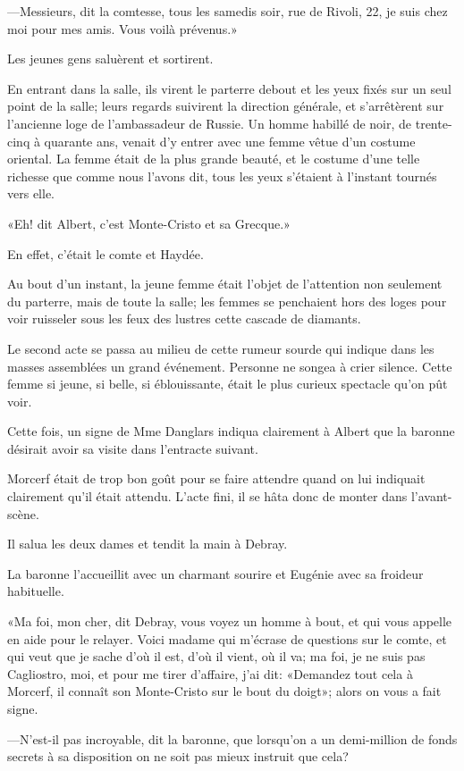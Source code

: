 —Messieurs, dit la comtesse, tous les samedis soir, rue de Rivoli, 22, je suis chez moi pour mes amis. Vous voilà prévenus.» 

Les jeunes gens saluèrent et sortirent. 

En entrant dans la salle, ils virent le parterre debout et les yeux fixés sur un seul point de la salle; leurs regards suivirent la direction générale, et s'arrêtèrent sur l'ancienne loge de l'ambassadeur de Russie. Un homme habillé de noir, de trente-cinq à quarante ans, venait d'y entrer avec une femme vêtue d'un costume oriental. La femme était de la plus grande beauté, et le costume d'une telle richesse que comme nous l'avons dit, tous les yeux s'étaient à l'instant tournés vers elle. 

«Eh! dit Albert, c'est Monte-Cristo et sa Grecque.» 

En effet, c'était le comte et Haydée. 

Au bout d'un instant, la jeune femme était l'objet de l'attention non seulement du parterre, mais de toute la salle; les femmes se penchaient hors des loges pour voir ruisseler sous les feux des lustres cette cascade de diamants. 

Le second acte se passa au milieu de cette rumeur sourde qui indique dans les masses assemblées un grand événement. Personne ne songea à crier silence. Cette femme si jeune, si belle, si éblouissante, était le plus curieux spectacle qu'on pût voir. 

Cette fois, un signe de Mme Danglars indiqua clairement à Albert que la baronne désirait avoir sa visite dans l'entracte suivant. 

Morcerf était de trop bon goût pour se faire attendre quand on lui indiquait clairement qu'il était attendu. L'acte fini, il se hâta donc de monter dans l'avant-scène. 

Il salua les deux dames et tendit la main à Debray. 

La baronne l'accueillit avec un charmant sourire et Eugénie avec sa froideur habituelle. 

«Ma foi, mon cher, dit Debray, vous voyez un homme à bout, et qui vous appelle en aide pour le relayer. Voici madame qui m'écrase de questions sur le comte, et qui veut que je sache d'où il est, d'où il vient, où il va; ma foi, je ne suis pas Cagliostro, moi, et pour me tirer d'affaire, j'ai dit: «Demandez tout cela à Morcerf, il connaît son Monte-Cristo sur le bout du doigt»; alors on vous a fait signe. 

—N'est-il pas incroyable, dit la baronne, que lorsqu'on a un demi-million de fonds secrets à sa disposition on ne soit pas mieux instruit que cela? 

